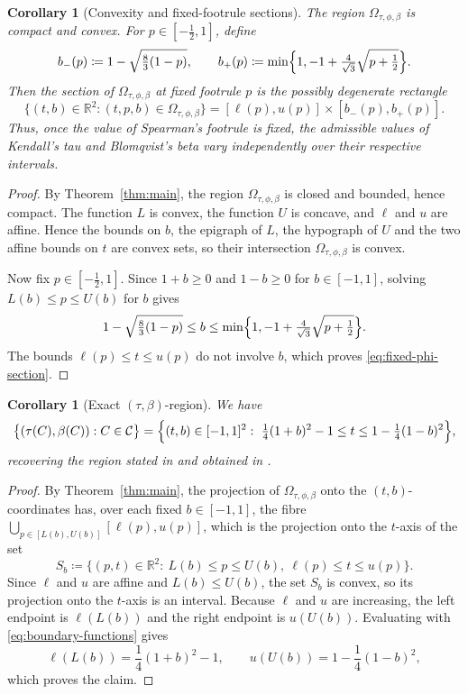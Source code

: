 \documentclass{article}
\newtheorem{corollary}[theorem]{Corollary}
\newcommand{\C}{\mathcal{C}}
\newcommand{\R}{\mathbb{R}}
\newcommand{\Om}{\Omega_{\tau,\phi,\beta}}
\begin{document}
\begin{corollary}[Convexity and fixed-footrule sections]\label{cor:fixed-phi}
The region $\Om$ is compact and convex.
For $p\in[-\frac12,1]$, define
\[
b_-(p)\coloneqq 1-\sqrt{\tfrac83(1-p)},\qquad
b_+(p)\coloneqq \min\Bigl\{1,-1+\tfrac4{\sqrt3}\sqrt{p+\tfrac12}\Bigr\}.
\]
Then the section of $\Om$ at fixed footrule $p$ is the possibly degenerate rectangle
\begin{equation}\label{eq:fixed-phi-section}
\bigl\{(t,b)\in\R^2:(t,p,b)\in\Om\bigr\}
=[\ell(p),u(p)]\times[b_-(p),b_+(p)].
\end{equation}
Thus, once the value of Spearman's footrule is fixed, the admissible values of Kendall's tau and Blomqvist's beta vary independently over their respective intervals.
\end{corollary}

\begin{proof}
By Theorem~\ref{thm:main}, the region $\Om$ is closed and bounded, hence compact.
The function $L$ is convex, the function $U$ is concave, and $\ell$ and $u$ are affine.
Hence the bounds on $b$, the epigraph of $L$, the hypograph of $U$ and the two affine bounds on $t$ are convex sets, so their intersection $\Om$ is convex.

Now fix $p\in[-\frac12,1]$.
Since $1+b\ge0$ and $1-b\ge0$ for $b\in[-1,1]$, solving $L(b)\le p\le U(b)$ for $b$ gives
\[
1-\sqrt{\tfrac83(1-p)}\le b
\le \min\Bigl\{1,-1+\tfrac4{\sqrt3}\sqrt{p+\tfrac12}\Bigr\}.
\]
The bounds $\ell(p)\le t\le u(p)$ do not involve $b$, which proves \eqref{eq:fixed-phi-section}.
\end{proof}

\begin{corollary}[Exact $(\tau,\beta)$-region]\label{cor:beta-tau}
We have
\[
\bigl\{(\tau(C),\beta(C)):C\in\C\bigr\}
=\Bigl\{(t,b)\in[-1,1]^2:\ \tfrac14(1+b)^2-1\le t\le 1-\tfrac14(1-b)^2\Bigr\},
\]
recovering the region stated in \cite[Exer.~5.17]{nelsen2006introduction} and obtained in \cite[Thm.~5 and Cor.~6]{kokolbukovsek2019relation}.
\end{corollary}

\begin{proof}
By Theorem~\ref{thm:main}, the projection of $\Om$ onto the $(t,b)$-coordinates has, over each fixed $b\in[-1,1]$, the fibre
\(
\bigcup_{p\in[L(b),U(b)]}[\ell(p),u(p)]
\),
which is the projection onto the $t$-axis of the set
\[
S_b\coloneqq
\bigl\{(p,t)\in\R^2:\ L(b)\le p\le U(b),\ \ell(p)\le t\le u(p)\bigr\}.
\]
Since $\ell$ and $u$ are affine and $L(b)\le U(b)$, the set $S_b$ is convex, so its projection onto the $t$-axis is an interval.
Because $\ell$ and $u$ are increasing, the left endpoint is $\ell(L(b))$ and the right endpoint is $u(U(b))$.
Evaluating with \eqref{eq:boundary-functions} gives
\[
\ell(L(b))=\frac14(1+b)^2-1,\qquad
u(U(b))=1-\frac14(1-b)^2,
\]
which proves the claim.
\end{proof}
\end{document}
